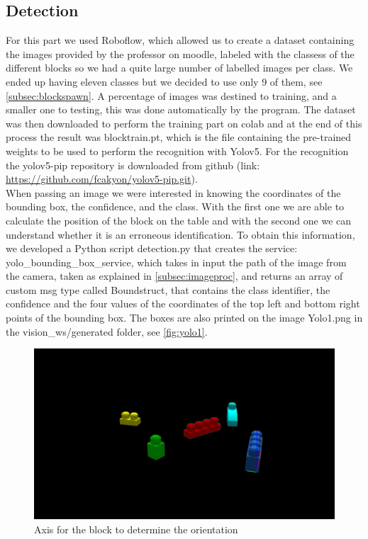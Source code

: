 \documentclass[12pt,a4paper]{article}
\begin{document}
\subsection{Detection}\label{subsec:detect}
For this part we used Roboflow, which allowed us to create a dataset containing the images provided by the professor on moodle, labeled with the classess of the different blocks so we had a quite large number of labelled images per class. We ended up having eleven classes but we decided to use only 9 of them, see \ref{subsec:blockspawn}. A percentage of images was destined to training, and a smaller one to testing, this was done automatically by the program. The dataset was then downloaded to perform the training part on colab and at the end of this process the result was blocktrain.pt, which is the file containing the pre-trained weights to be used to perform the recognition with Yolov5. 
For the recognition the yolov5-pip repository is downloaded from github (link: \url{https://github.com/fcakyon/yolov5-pip.git}).\\
When passing an image we were interested in knowing the coordinates of the bounding box, the confidence, and the class. With the first one we are able to calculate the position of the block on the table and with the second one we can understand whether it is an erroneous identification. To obtain this information, we developed a Python script detection.py that creates the service: yolo\_bounding\_box\_service, which takes in input the path of the image from the camera, taken as explained in \ref{subsec:imageproc}, and returns an array of custom msg type called Boundstruct, that contains the class identifier, the confidence and the four values of the coordinates of the top left and bottom right points of the bounding box. The boxes are also printed on the image Yolo1.png in the vision\_ws/generated folder, see \ref{fig:yolo1}.
\begin{center}
    \begin{figure}
        \centering
        \includegraphics[width=1.0\columnwidth]{images/Obj1.png}
        \caption{Axis for the block to determine the orientation}
        \label{fig:obj1}
    \end{figure}
\end{center}
\end{document}
